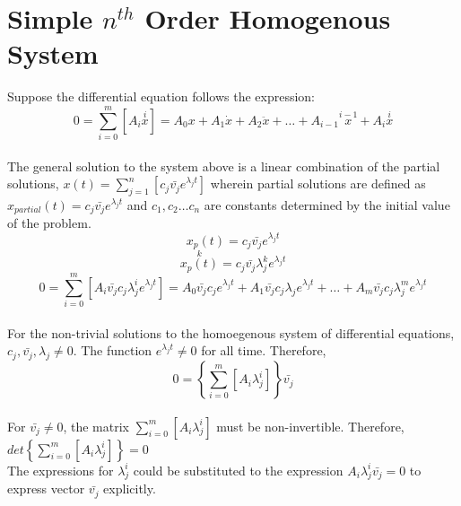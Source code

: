 \section{Simple $n^{th}$ Order Homogenous System}
\begin{comment}
\end{comment}
Suppose the differential equation follows the expression:
$$0 = \sum_{i = 0}^{m}{[A_i \overset{i}{x}]} = A_0 x + A_1 \dot{x} + A_2 \ddot{x}+ \dots + A_{i - 1} \overset{i -  1}{x} + A_{i} \overset{i}{x}$$
\\The general solution to the system above is a linear combination of the partial solutions, $\displaystyle{x(t) = \sum_{j = 1}^{n}{[c_j \bar{v_j}e^{\lambda_j t}]}}$ wherein partial solutions are defined as $\displaystyle{x_{partial}(t) = c_j \bar{v_j}e^{\lambda_j t}}$ and $c_1, c_2 \dots c_n$ are constants determined by the initial value of the problem. 
$$x_{p}(t) = c_j \bar{v_j}e^{\lambda_j t}$$
$$\overset{k}{x_{p}(t)} = c_j \bar{v_j}\lambda_{j}^k e^{\lambda_j t}$$
$$0 = \sum_{i = 0}^{m}{[A_i \bar{v_j} c_j \lambda_{j}^i e^{\lambda_j t}]} =A_0 \bar{v_j} c_j e^{\lambda_j t} + A_1 \bar{v_j} c_j \lambda_{j} e^{\lambda_j t} + \dots + A_m \bar{v_j} c_j \lambda_{j}^m e^{\lambda_j t}$$
\\For the non-trivial solutions to the homoegenous system of differential equations, $\displaystyle{c_j, \bar{v_j}, \lambda_j \neq 0}$. The function $\displaystyle{e^{\lambda_j t}}\neq 0$ for all time. Therefore, 
$$0 = \left\{ \sum_{i = 0}^{m}{[A_i \lambda_{j}^i]} \right\} \bar{v_j}$$
\\For $\displaystyle{\bar{v_j} \neq 0}$, the matrix $\displaystyle{\sum_{i = 0}^{m}{[A_i \lambda_{j}^i]}}$ must be non-invertible. Therefore, $\displaystyle{det\left\{ \sum_{i = 0}^{m}{[A_i \lambda_{j}^i]} \right\} = 0}$
\\The expressions for $\displaystyle{\lambda_j ^ i}$ could be substituted to the expression $\displaystyle{A_i \lambda_{j}^i} \bar{v_j} = 0$ to express vector $\displaystyle{\bar{v_j}}$ explicitly.
